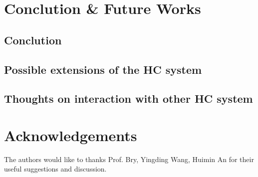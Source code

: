 \section{Conclution \& Future Works}

\subsection{Conclution}

\subsection{Possible extensions of the HC system}

\subsection{Thoughts on interaction with other HC system}

\section{Acknowledgements}

The authors would like to thanks Prof. Bry, Yingding Wang, Huimin An for their useful suggestions and discussion.